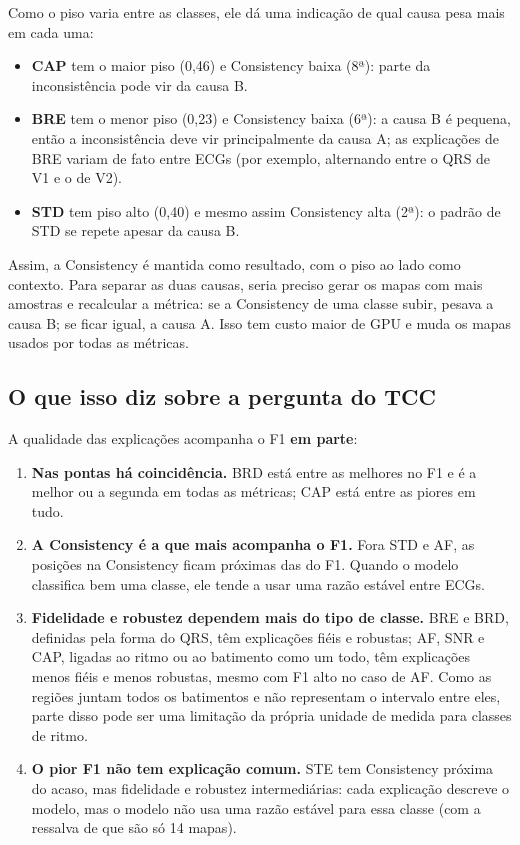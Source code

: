\documentclass[11pt,a4paper]{article}
\begin{document}
Como o piso varia entre as classes, ele dá uma indicação de qual causa pesa mais em cada uma:
\begin{itemize}
    \item \textbf{CAP} tem o maior piso (0,46) e Consistency baixa (8ª): parte da inconsistência pode vir da causa B.
    \item \textbf{BRE} tem o menor piso (0,23) e Consistency baixa (6ª): a causa B é pequena, então a inconsistência deve vir principalmente da causa A; as explicações de BRE variam de fato entre ECGs (por exemplo, alternando entre o QRS de V1 e o de V2).
    \item \textbf{STD} tem piso alto (0,40) e mesmo assim Consistency alta (2ª): o padrão de STD se repete apesar da causa B.
\end{itemize}
Assim, a Consistency é mantida como resultado, com o piso ao lado como contexto. Para separar as duas causas, seria preciso gerar os mapas com mais amostras e recalcular a métrica: se a Consistency de uma classe subir, pesava a causa B; se ficar igual, a causa A. Isso tem custo maior de GPU e muda os mapas usados por todas as métricas.

\subsection{O que isso diz sobre a pergunta do TCC}
A qualidade das explicações acompanha o F1 \textbf{em parte}:
\begin{enumerate}
    \item \textbf{Nas pontas há coincidência.} BRD está entre as melhores no F1 e é a melhor ou a segunda em todas as métricas; CAP está entre as piores em tudo.
    \item \textbf{A Consistency é a que mais acompanha o F1.} Fora STD e AF, as posições na Consistency ficam próximas das do F1. Quando o modelo classifica bem uma classe, ele tende a usar uma razão estável entre ECGs.
    \item \textbf{Fidelidade e robustez dependem mais do tipo de classe.} BRE e BRD, definidas pela forma do QRS, têm explicações fiéis e robustas; AF, SNR e CAP, ligadas ao ritmo ou ao batimento como um todo, têm explicações menos fiéis e menos robustas, mesmo com F1 alto no caso de AF. Como as regiões juntam todos os batimentos e não representam o intervalo entre eles, parte disso pode ser uma limitação da própria unidade de medida para classes de ritmo.
    \item \textbf{O pior F1 não tem explicação comum.} STE tem Consistency próxima do acaso, mas fidelidade e robustez intermediárias: cada explicação descreve o modelo, mas o modelo não usa uma razão estável para essa classe (com a ressalva de que são só 14 mapas).
\end{enumerate}
\end{document}
